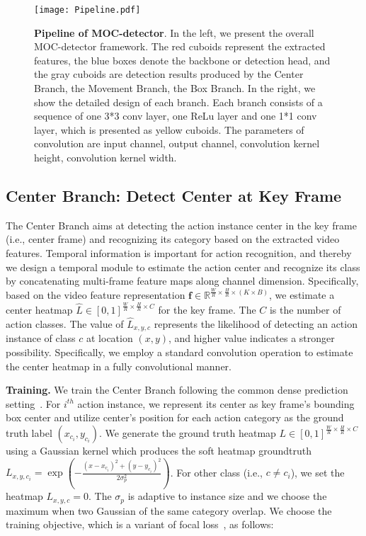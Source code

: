 \documentclass[runningheads]{llncs}
\begin{document}
\begin{figure}[t]
  \centering
    \texttt{[image: Pipeline.pdf]}
    \caption{{\bf Pipeline of MOC-detector}.
    In the left, we present the overall MOC-detector framework. The red cuboids represent the extracted features, the blue boxes denote the backbone or detection head, and the gray cuboids are detection results produced by the Center Branch, the Movement Branch, the Box Branch.
    In the right, we show the detailed design of each branch. Each branch consists of a sequence of one 3*3 conv layer, one ReLu layer and one 1*1 conv layer, which is presented as yellow cuboids. The parameters of convolution are input channel, output channel, convolution kernel height, convolution kernel width.
    }
    \label{fig:pipeline}
  \end{figure}

\subsection{Center Branch: Detect Center at Key Frame}\label{CenterBranch}
The Center Branch aims at detecting the action instance center in the key frame (i.e., center frame) and recognizing its category based on the extracted video features. Temporal information is important for action recognition, and thereby we design a temporal module to estimate the action center and recognize its class by concatenating multi-frame feature maps along channel dimension. Specifically, based on the video feature representation $\mathbf{f} \in \mathbb{R}^{\frac{W}{R} \times \frac{H}{R} \times (K \times B)}$, we estimate a center heatmap $\hat{L} \in [0,1]^{\frac{W}{R}\times\frac{H}{R}\times C}$ for the key frame. The $C$ is the number of action classes. The value of $\hat{L}_{x,y,c}$ represents the likelihood of detecting an action instance of class $c$ at location $(x, y)$, and higher value indicates a stronger possibility. Specifically, we employ a standard convolution operation to estimate the center heatmap in a fully convolutional manner.

\textbf{Training.} We train the Center Branch following the common dense prediction setting~\cite{CornerNet,CenterNet}. For $i^{th}$ action instance, we represent its center as key frame's bounding box center and utilize center's position for each action category as the ground truth label $(x_{c_i},y_{c_i})$. We generate the ground truth heatmap $L\in[0,1]^{\frac{W}{R}\times\frac{H}{R}\times C}$ using a
 Gaussian kernel which produces the soft heatmap groundtruth $L_{x,y,c_i}=\exp(-\frac{(x-x_{c_i})^2+(y-y_{c_i})^2}{2\sigma_p^2})$. For other class (i.e., $c\neq c_i$), we set the heatmap $L_{x,y,c}=0$.
The $\sigma_p$ is adaptive to instance size and we choose the maximum when two Gaussian of the same category overlap. We choose the training objective, which is a variant of focal loss~\cite{lin2017focal}, as follows:
\end{document}
